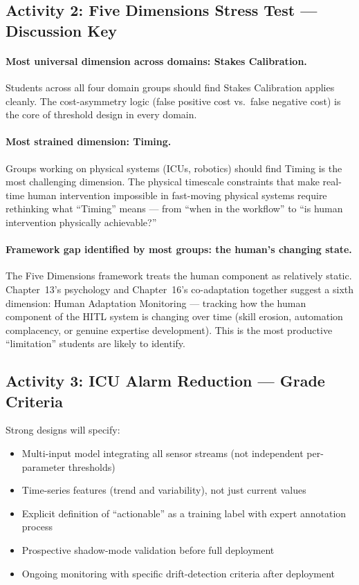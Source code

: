 \subsection{Activity 2: Five Dimensions Stress Test --- Discussion Key}

\paragraph{Most universal dimension across domains: Stakes Calibration.}

Students across all four domain groups should find Stakes Calibration applies cleanly. The cost-asymmetry logic (false positive cost vs.\ false negative cost) is the core of threshold design in every domain.

\paragraph{Most strained dimension: Timing.}

Groups working on physical systems (ICUs, robotics) should find Timing is the most challenging dimension. The physical timescale constraints that make real-time human intervention impossible in fast-moving physical systems require rethinking what ``Timing'' means --- from ``when in the workflow'' to ``is human intervention physically achievable?''

\paragraph{Framework gap identified by most groups: the human's changing state.}

The Five Dimensions framework treats the human component as relatively static. Chapter~13's psychology and Chapter~16's co-adaptation together suggest a sixth dimension: Human Adaptation Monitoring --- tracking how the human component of the HITL system is changing over time (skill erosion, automation complacency, or genuine expertise development). This is the most productive ``limitation'' students are likely to identify.

\subsection{Activity 3: ICU Alarm Reduction --- Grade Criteria}

Strong designs will specify:
\begin{itemize}
    \item Multi-input model integrating all sensor streams (not independent per-parameter thresholds)
    \item Time-series features (trend and variability), not just current values
    \item Explicit definition of ``actionable'' as a training label with expert annotation process
    \item Prospective shadow-mode validation before full deployment
    \item Ongoing monitoring with specific drift-detection criteria after deployment
\end{itemize}


